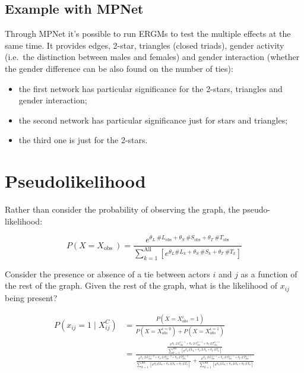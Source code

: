 \documentclass[
  notitlepage,
  onecolumn,
  openany]{book}
\providecommand{\tightlist}{%
  \setlength{\itemsep}{0pt}\setlength{\parskip}{0pt}}
\begin{document}
\hypertarget{example-with-mpnet}{%
\subsection{Example with MPNet}\label{example-with-mpnet}}

Through MPNet it's possible to run ERGMs to test the multiple effects at the same time. It provides edges, 2-star, triangles (closed triads), gender activity (i.e.~the distinction between males and females) and gender interaction (whether the gender difference can be also found on the number of ties):

\begin{itemize}
\tightlist
\item
  the first network has particular significance for the 2-stars, triangles and gender interaction;
\item
  the second network has particular significance just for stars and triangles;
\item
  the third one is just for the 2-stars.
\end{itemize}

\hypertarget{pseudolikelihood}{%
\section{Pseudolikelihood}\label{pseudolikelihood}}

Rather than consider the probability of observing the graph, the pseudo-likelihood:

\[
P\left(X=X_{\text {obs }}\right) = \frac{e^{\theta_{L}\ \# L_{\text {obs}}+\theta_{S} \ \# S_{\text {obs}}+\theta_{T}\ \# T_{\text {obs}}}}{\sum_{k=1}^{\text {All }}[e^{\theta_{L} \#L_{k}+\theta_{S} \ \# S_{k}+\theta_{T} \ \#T_{k}}]}
\]

Consider the presence or absence of a tie between actors \(i\) and \(j\) as a function of the rest of the graph. Given the rest of the graph, what is the likelihood of \(x_{ij}\) being present?

\[
\begin{aligned}
P(x_{ij} =1 \mid X_{ij}^{C}) &=\frac{P\left(X=X_{obs}^{i}=1\right)}{{P}\left({X}={X}_{{obs}}^{{i}=0}\right)+{P}\left({X}={X}_{{obs}}^{{i}=1}\right)}\\
&= \frac{\frac{e^{\theta_{L}\ \# L_{\text {obs}}^{ij=1}+\theta_{S} \ \# S_{\text {obs}}^{ij=1}+\theta_{T}\ \# T_{\text {obs}}^{ij=1}}}{\sum_{k=1}^{\text {All }}[e^{\theta_{L} \#L_{k}+\theta_{S} \ \# S_{k}+\theta_{T} \ \#T_{k}}]}}{\frac{e^{\theta_{L}\ \# L_{\text {obs}}^{ij=0}+\theta_{S} \ \# S_{\text {obs}}^{ij=0}+\theta_{T}\ \# T_{\text {obs}}^{ij=0}}}{\sum_{k=1}^{\text {All }}[e^{\theta_{L} \#L_{k}+\theta_{S} \ \# S_{k}+\theta_{T} \ \#T_{k}}]}+\frac{e^{\theta_{L}\ \# L_{\text {obs}}^{ij=1}+\theta_{S} \ \# S_{\text {obs}}^{ij=1}+\theta_{T}\ \# T_{\text {obs}}^{ij=1}}}{\sum_{k=1}^{\text {All }}[e^{\theta_{L} \#L_{k}+\theta_{S} \ \# S_{k}+\theta_{T} \ \#T_{k}}]}}
\end{aligned}
\]
\end{document}
